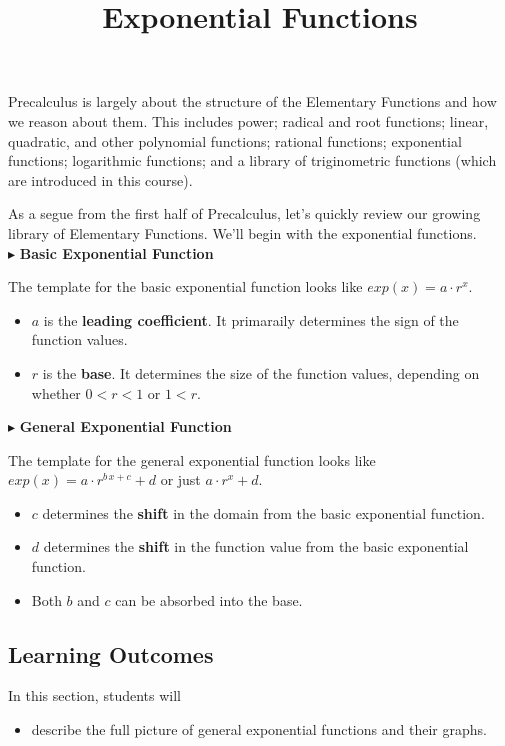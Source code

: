\documentclass{ximera}
\title{Exponential Functions}
\begin{document}
\begin{abstract}
\end{abstract}
\maketitle




Precalculus is largely about the structure of the Elementary Functions and how we reason about them.  This includes power; radical and root functions; linear, quadratic, and other polynomial functions; rational functions; exponential functions; logarithmic functions; and a library of triginometric functions (which are introduced in this course).

As a segue from the first half of Precalculus, let's quickly review our growing library of Elementary Functions. We'll begin with the exponential functions.   \\





$\blacktriangleright$ \textbf{Basic Exponential Function}


The template for the basic exponential function looks like $exp(x) = a \cdot r^x$. 

\begin{itemize}
\item $a$ is the \textbf{\textcolor{purple!85!blue}{leading coefficient}}.  It primaraily determines the sign of the function values.
\item $r$ is the \textbf{\textcolor{purple!85!blue}{base}}. It determines the size of the function values, depending on whether $0 < r < 1$ or $1 < r$.
\end{itemize}





$\blacktriangleright$ \textbf{General Exponential Function}

The template for the general exponential function looks like $exp(x) = a \cdot r^{b \, x + c} + d$ or just $a \cdot r^x + d$. 

\begin{itemize}
\item $c$ determines the \textbf{\textcolor{purple!85!blue}{shift}} in the domain from the basic exponential function.  
\item $d$ determines the \textbf{\textcolor{purple!85!blue}{shift}} in the function value from the basic exponential function. 
\item Both $b$ and $c$ can be absorbed into the base.
\end{itemize}









\subsection{Learning Outcomes}


\begin{sectionOutcomes}
In this section, students will 

\begin{itemize}
\item describe the full picture of general exponential functions and their graphs.
\end{itemize}
\end{sectionOutcomes}
\end{document}
